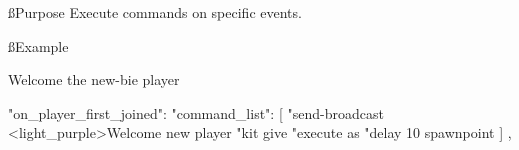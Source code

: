 
\ss{Purpose}
Execute commands on specific events.

\ss{Example}

\begin{example}{Welcome the new-bie player}
    \begin{json}
        "on_player_first_joined": {
            "command_list": [
            "send-broadcast <light_purple>Welcome new player %
            "kit give %
            "execute as %
            "delay 10 spawnpoint %
            ]
        },
    \end{json}
\end{example}